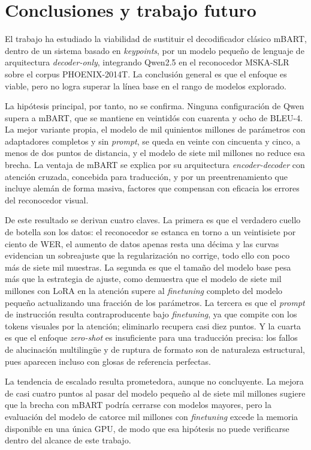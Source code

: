 \documentclass[11pt]{article}
\begin{document}
\section{Conclusiones y trabajo futuro}

El trabajo ha estudiado la viabilidad de sustituir el decodificador clásico mBART, dentro de un sistema basado en \textit{keypoints}, por un modelo pequeño de lenguaje de arquitectura \textit{decoder-only}, integrando Qwen2.5 en el reconocedor MSKA-SLR sobre el corpus PHOENIX-2014T. La conclusión general es que el enfoque es viable, pero no logra superar la línea base en el rango de modelos explorado.

La hipótesis principal, por tanto, no se confirma. Ninguna configuración de Qwen supera a mBART, que se mantiene en veintidós con cuarenta y ocho de BLEU-4. La mejor variante propia, el modelo de mil quinientos millones de parámetros con adaptadores completos y sin \textit{prompt}, se queda en veinte con cincuenta y cinco, a menos de dos puntos de distancia, y el modelo de siete mil millones no reduce esa brecha. La ventaja de mBART se explica por su arquitectura \textit{encoder-decoder} con atención cruzada, concebida para traducción, y por un preentrenamiento que incluye alemán de forma masiva, factores que compensan con eficacia los errores del reconocedor visual.

De este resultado se derivan cuatro claves. La primera es que el verdadero cuello de botella son los datos: el reconocedor se estanca en torno a un veintisiete por ciento de WER, el aumento de datos apenas resta una décima y las curvas evidencian un sobreajuste que la regularización no corrige, todo ello con poco más de siete mil muestras. La segunda es que el tamaño del modelo base pesa más que la estrategia de ajuste, como demuestra que el modelo de siete mil millones con LoRA en la atención supere al \textit{finetuning} completo del modelo pequeño actualizando una fracción de los parámetros. La tercera es que el \textit{prompt} de instrucción resulta contraproducente bajo \textit{finetuning}, ya que compite con los tokens visuales por la atención; eliminarlo recupera casi diez puntos. Y la cuarta es que el enfoque \textit{zero-shot} es insuficiente para una traducción precisa: los fallos de alucinación multilingüe y de ruptura de formato son de naturaleza estructural, pues aparecen incluso con glosas de referencia perfectas.

La tendencia de escalado resulta prometedora, aunque no concluyente. La mejora de casi cuatro puntos al pasar del modelo pequeño al de siete mil millones sugiere que la brecha con mBART podría cerrarse con modelos mayores, pero la evaluación del modelo de catorce mil millones con \textit{finetuning} excede la memoria disponible en una única GPU, de modo que esa hipótesis no puede verificarse dentro del alcance de este trabajo.
\end{document}
